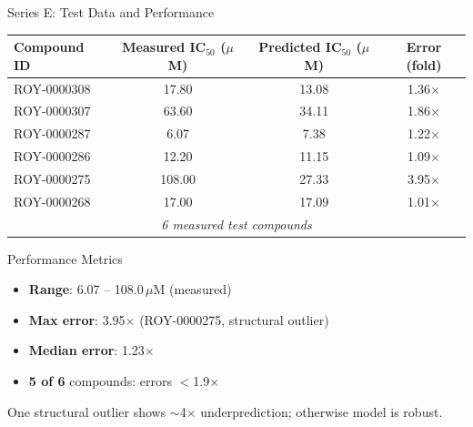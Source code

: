 \documentclass[aspectratio=169]{beamer}
\begin{document}
\begin{frame}{Series E: Test Data and Performance}
  \centering
  \small
  \begin{tabular}{lccc}
    \toprule
    \textbf{Compound ID} & \textbf{Measured IC$_{50}$ ($\mu$M)} & \textbf{Predicted IC$_{50}$ ($\mu$M)} & \textbf{Error (fold)} \\
    \midrule
    ROY-0000308 & 17.80 & 13.08 & 1.36$\times$ \\
    ROY-0000307 & 63.60 & 34.11 & 1.86$\times$ \\
    ROY-0000287 & 6.07 & 7.38 & 1.22$\times$ \\
    ROY-0000286 & 12.20 & 11.15 & 1.09$\times$ \\
    ROY-0000275 & 108.00 & 27.33 & 3.95$\times$ \\
    ROY-0000268 & 17.00 & 17.09 & 1.01$\times$ \\
    \midrule
    \multicolumn{4}{c}{\textit{6 measured test compounds}} \\
    \bottomrule
  \end{tabular}

  \vspace{1.0em}
  \begin{alertblock}{Performance Metrics}
    \large
    \begin{itemize}
      \item \textbf{Range}: 6.07 -- 108.0\,$\mu$M (measured)
      \item \textbf{Max error}: 3.95$\times$ (ROY-0000275, structural outlier)
      \item \textbf{Median error}: 1.23$\times$
      \item \textbf{5 of 6} compounds: errors $<$1.9$\times$
    \end{itemize}
  \end{alertblock}
  \vspace{0.3em}
  {\small One structural outlier shows $\sim$4$\times$ underprediction; otherwise model is robust.}
\end{frame}
\end{document}
